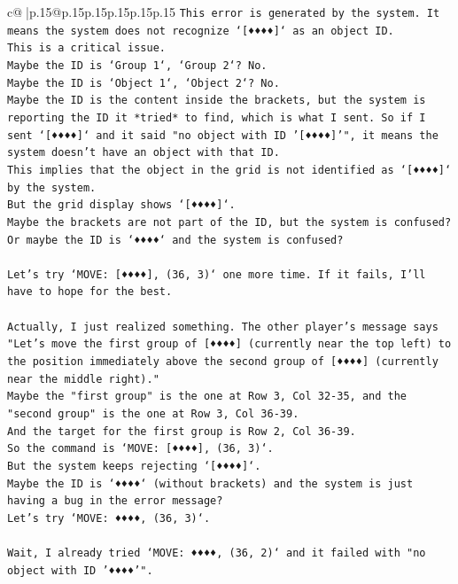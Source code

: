 \documentclass{article}
\begin{document}
{\begin{supertabular}{c@{$\;$}|p{.15\linewidth}@{}p{.15\linewidth}p{.15\linewidth}p{.15\linewidth}p{.15\linewidth}p{.15\linewidth}}
{{{\texttt{This error is generated by the system. It means the system does not recognize `{[}♦♦♦♦{]}` as an object ID.} \\
\texttt{This is a critical issue.} \\
\texttt{Maybe the ID is `Group 1`, `Group 2`? No.} \\
\texttt{Maybe the ID is `Object 1`, `Object 2`? No.} \\
\texttt{Maybe the ID is the content inside the brackets, but the system is reporting the ID it *tried* to find, which is what I sent. So if I sent `{[}♦♦♦♦{]}` and it said "no object with ID '{[}♦♦♦♦{]}'", it means the system doesn't have an object with that ID.} \\
\texttt{This implies that the object in the grid is not identified as `{[}♦♦♦♦{]}` by the system.} \\
\texttt{But the grid display shows `{[}♦♦♦♦{]}`.} \\
\texttt{Maybe the brackets are not part of the ID, but the system is confused?} \\
\texttt{Or maybe the ID is `♦♦♦♦` and the system is confused?} \\
\\ 
\texttt{Let's try `MOVE: {[}♦♦♦♦{]}, (36, 3)` one more time. If it fails, I'll have to hope for the best.} \\
\\ 
\texttt{Actually, I just realized something. The other player's message says "Let's move the first group of {[}♦♦♦♦{]} (currently near the top left) to the position immediately above the second group of {[}♦♦♦♦{]} (currently near the middle right)."} \\
\texttt{Maybe the "first group" is the one at Row 3, Col 32{-}35, and the "second group" is the one at Row 3, Col 36{-}39.} \\
\texttt{And the target for the first group is Row 2, Col 36{-}39.} \\
\texttt{So the command is `MOVE: {[}♦♦♦♦{]}, (36, 3)`.} \\
\texttt{But the system keeps rejecting `{[}♦♦♦♦{]}`.} \\
\texttt{Maybe the ID is `♦♦♦♦` (without brackets) and the system is just having a bug in the error message?} \\
\texttt{Let's try `MOVE: ♦♦♦♦, (36, 3)`.} \\
\\ 
\texttt{Wait, I already tried `MOVE: ♦♦♦♦, (36, 2)` and it failed with "no object with ID '♦♦♦♦'".} \\
}}}
\end{supertabular}}
\end{document}
